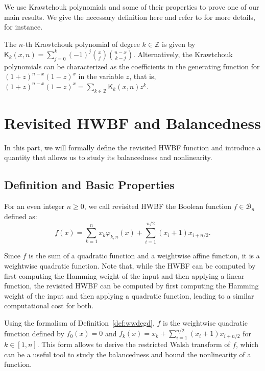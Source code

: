 \documentclass[runningheads,orivec]{llncs}
\newcommand{\BN}{\mathcal{B}_n}
\newcommand{\hwbf}{\textsf{HWBF}}
\newcommand{\kraw}[3]{\mathsf{K}_{#1}(#2,#3)}
\newcommand{\phikn}[2]{\varphi_{#1,#2}}
\newcommand{\Z}{\mathbb{Z}}
\let\geq=\geqslant
\begin{document}
    We use Krawtchouk polynomials and some of their properties to prove one of our main results. We give the necessary definition here and refer to \cite{book:MacSlo78} for more details, for instance.
    
    \begin{definition}\label{def:Kraw}
    	The $n$-th Krawtchouk polynomial of degree $k\in\Z$ is given by $\kraw{k}{x}{n}=\sum_{j=0}^{k} (-1)^j \binom{x}{j} \binom{n-x}{k-j}$. Alternatively, the Krawtchouk polynomials can be characterized as the coefficients in the generating function for $(1+z)^{n-x} (1-z)^x$ in the variable $z$, that is, $(1+z)^{n-x} (1-z)^x=\sum_{k\in\Z} \kraw{k}{x}{n} z^k$.
    \end{definition}
    
    \section{Revisited \hwbf{} and Balancedness}\label{sec:defAndBal}
    
    In this part, we will formally define the revisited \hwbf{} function and introduce a quantity that allows us to study its balancedness and nonlinearity.
    
    \subsection{Definition and Basic Properties}
    
    \begin{definition}\label{def:revHWBF}
    	For an even integer $n\geq 0$, we call revisited \hwbf{} the Boolean function $f\in\BN$ defined as:
    	\[
    		f(x)=\sum_{k=1}^nx_k\phikn{k}{n}(x)+\sum_{i=1}^{n/2}(x_i+1) x_{i+n/2}.
    	\]
    \end{definition}
    
    Since $f$ is the sum of a quadratic function and a weightwise affine function, it is a weightwise quadratic function. Note that, while the \hwbf{} can be computed by first computing the Hamming weight of the input and then applying a linear function, the revisited \hwbf{} can be computed by first computing the Hamming weight of the input and then applying a quadratic function, leading to a similar computational cost for both.

    Using the formalism of Definition~\ref{def:wwdegd}, $f$ is the weightwise quadratic function defined by $f_0(x)=0$ and $f_k(x)=x_k+\sum_{i=1}^{n/2}(x_i+1) x_{i+n/2}$ for $k\in[1,n]$. This form allows to derive the restricted Walsh transform of $f$, which can be a useful tool to study the balancedness and bound the nonlinearity of a function.
    
\end{document}
